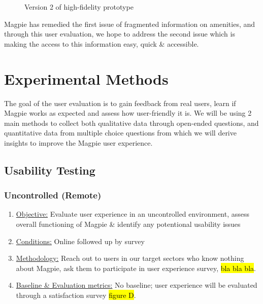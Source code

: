 \documentclass{report}
\begin{document}
\begin{figure}
\begin{minipage}{0.45\textwidth}
        \caption{Version 2 of high-fidelity prototype}
        \label{fig:plot8}
    \end{minipage}
\end{figure}

Magpie has remedied the first issue of fragmented information on amenities, and through this user evaluation, we hope to address the second issue which is making the access to this information easy, quick \& accessible.

\chapter{Experimental Methods}
The goal of the user evaluation is to gain feedback from real users, learn if Magpie works as expected and assess how user-friendly it is. We will be using 2 main methods to collect both qualitative data through open-ended questions, and quantitative data from multiple choice questions from which we will derive insights to improve the Magpie user experience.
\section{Usability Testing}
\subsection{Uncontrolled (Remote)}
\begin{enumerate}
    \item \underline{Objective:} Evaluate user experience in an uncontrolled environment, assess overall functioning of Magpie \& identify any potentional usability issues
    \item \underline{Conditions:} Online followed up by survey
    \item \underline{Methodology:} Reach out to users in our target sectors who know nothing about Magpie, ask them to participate in user experience survey, \hl{bla bla bla}.
    \item \underline{Baseline \& Evaluation metrics:} No baseline; user experience will be evaluated through a satisfaction survey \hl{figure D}.
\end{enumerate}
\end{document}
